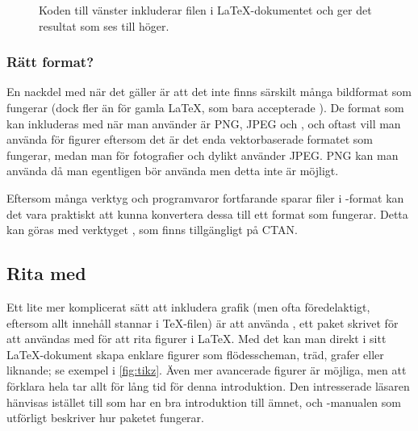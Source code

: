 \documentclass[lang=sv,ptsize=10pt,font=none,nomath,titles=bf,../../a4.tex]{subfiles}
\begin{document}
\begin{figure}[tbp]
	\centering
	\hspace{-0.025\textwidth}
	\begin{minipage}{0.475\textwidth} %
	\end{minipage}
	\hfil
	\begin{minipage}{0.475\textwidth} %
	\end{minipage}
	\caption{Koden till vänster inkluderar filen  i
	\LaTeX-dokumentet och ger det resultat som ses till höger.}
	\label{fig:graphicx}
\end{figure}

\subsubsection{Rätt format?}
En nackdel med \pdfLaTeX{} när det gäller  är att det inte
finns särskilt många bildformat som fungerar (dock fler än för gamla
\LaTeX{}, som bara accepterade \EPS). De format som kan inkluderas
med  när man använder \pdfLaTeX{} är \textsc{PNG},
\textsc{JPEG} och \PDF, och oftast vill man använda \PDF{} för figurer
eftersom
det är det enda vektorbaserade formatet som fungerar, medan man för
fotografier och dylikt använder \textsc{JPEG}. \textsc{PNG} kan man
använda då man egentligen bör använda \PDF{} men detta inte är möjligt.

Eftersom många verktyg och programvaror fortfarande sparar filer i
\EPS-format kan det vara praktiskt att kunna konvertera dessa till ett
format som fungerar. Detta kan göras med verktyget , som
finns tillgängligt på CTAN.

\subsection{Rita med \PGFTikZ}
Ett lite mer komplicerat sätt att inkludera grafik (men ofta 
föredelaktigt, eftersom allt innehåll stannar i \TeX-filen) är att använda
\PGFTikZ, ett paket skrivet för att användas med \pdfLaTeX{} för att rita
figurer i \LaTeX{}. Med det kan man direkt i sitt \LaTeX-dokument skapa
enklare figurer som flödesscheman, träd, grafer eller liknande; se exempel
i \cref{fig:tikz}. Även mer avancerade figurer är möjliga, men att
förklara hela \PGFTikZ{} tar allt för lång tid för denna introduktion. Den
intresserade läsaren hänvisas istället till \textcite{Mertz07} som har
en bra introduktion till ämnet, och \PGFTikZ-manualen \parencite{Tantau10} som
utförligt beskriver hur paketet fungerar.
\end{document}

